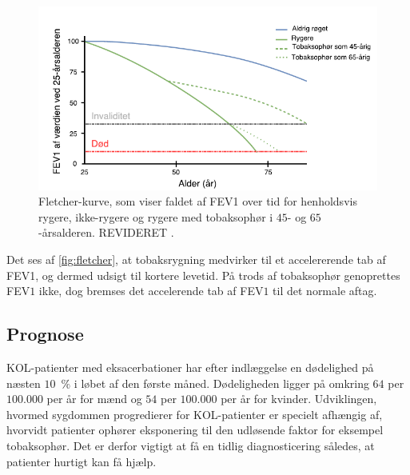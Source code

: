 \begin{figure} [H]
\centering
\includegraphics[width=1\textwidth]{figures/fletcher}
\caption{Fletcher-kurve, som viser faldet af FEV1 over tid for henholdsvis rygere, ikke-rygere og rygere med tobaksophør i $45$- og $65$-årsalderen. REVIDERET \cite{Basisbogen2016}.}
\label{fig:fletcher}
\end{figure} 

\noindent
Det ses af \autoref{fig:fletcher}, at tobaksrygning medvirker til et accelererende tab af FEV1, og dermed udsigt til kortere levetid. På trods af tobaksophør genoprettes FEV$1$ ikke, dog bremses det accelerende tab af FEV$1$ til det normale aftag.\cite{dsam2016}

\subsection{Prognose}
KOL-patienter med eksacerbationer har efter indlæggelse en dødelighed på næsten $10$~$\%$ i løbet af den første måned. Dødeligheden ligger på omkring $64$ per $100.000$ per år for mænd og $54$ per $100.000$ per år for kvinder.
Udviklingen, hvormed sygdommen progredierer for KOL-patienter er specielt afhængig af, hvorvidt patienter ophører eksponering til den udløsende faktor for eksempel tobaksophør. Det er derfor vigtigt at få en tidlig diagnosticering således, at patienter hurtigt kan få hjælp.\cite{dsam2016}

